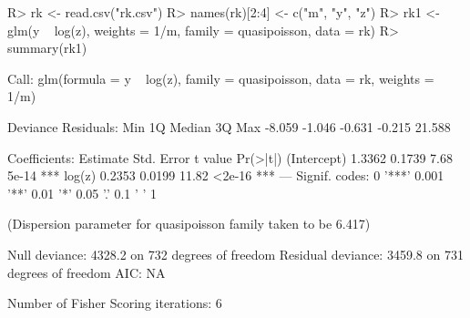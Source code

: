 \documentclass[10pt,a4paper,twoside]{article}
\newenvironment{Schunk}{}{}
\begin{document}
\begin{Schunk}
\begin{Sinput}
R> rk <- read.csv("rk.csv")
R> names(rk)[2:4] <- c("m", "y", "z")
R> rk1 <- glm(y ~ log(z), weights = 1/m, family = quasipoisson, data = rk)
R> summary(rk1)
\end{Sinput}
\begin{Soutput}
Call:
glm(formula = y ~ log(z), family = quasipoisson, data = rk, weights = 1/m)

Deviance Residuals: 
   Min      1Q  Median      3Q     Max  
-8.059  -1.046  -0.631  -0.215  21.588  

Coefficients:
            Estimate Std. Error t value Pr(>|t|)    
(Intercept)   1.3362     0.1739    7.68    5e-14 ***
log(z)        0.2353     0.0199   11.82   <2e-16 ***
---
Signif. codes:  0 '***' 0.001 '**' 0.01 '*' 0.05 '.' 0.1 ' ' 1 

(Dispersion parameter for quasipoisson family taken to be 6.417)

    Null deviance: 4328.2  on 732  degrees of freedom
Residual deviance: 3459.8  on 731  degrees of freedom
AIC: NA

Number of Fisher Scoring iterations: 6
\end{Soutput}
\end{Schunk}
\end{document}
